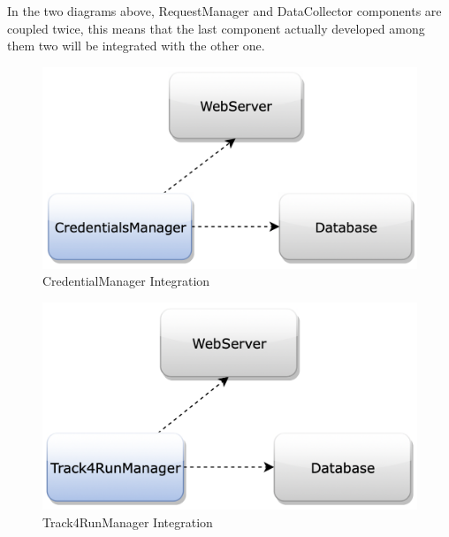\noindent
In the two diagrams above, RequestManager and DataCollector components are coupled twice, this means that the last component actually developed among them two will be integrated with the other one.

\begin{figure}[H]
\centering
\includegraphics[scale=0.35]{Images/IntegrationPlanImages/fig3.png}
\caption{CredentialManager Integration}
\end{figure}

\begin{figure}[H]
\centering
\includegraphics[scale=0.35]{Images/IntegrationPlanImages/fig4.png}
\caption{Track4RunManager Integration}
\end{figure}


